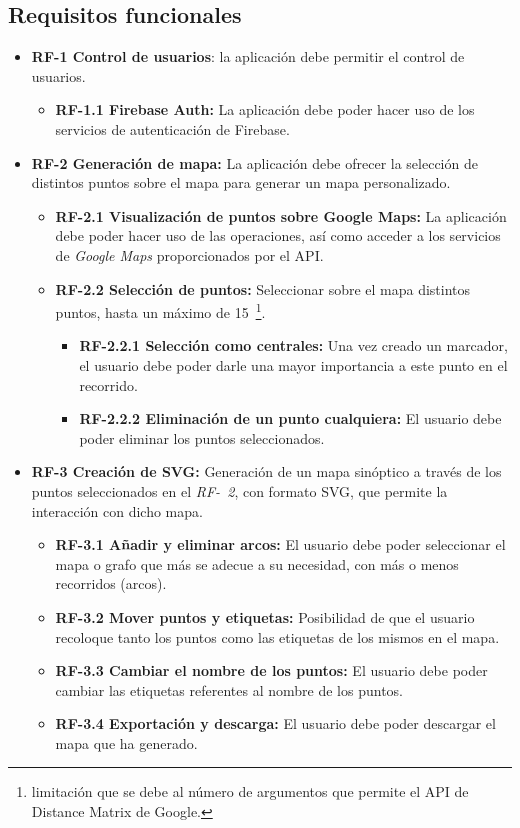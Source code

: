 \subsection{Requisitos funcionales}
\begin{itemize}
	\item \textbf{RF-1 Control de usuarios}: la aplicación debe permitir el control de usuarios.
	\begin{itemize}
		\item \textbf{RF-1.1 Firebase Auth:} La aplicación debe poder hacer uso de los servicios de autenticación de Firebase.
	\end{itemize}
	\item \textbf{RF-2 Generación de mapa:} La aplicación debe ofrecer la selección de distintos puntos sobre el mapa para generar un mapa personalizado.
	\begin{itemize}
		\item \textbf{RF-2.1 Visualización de puntos sobre Google Maps:} La aplicación debe poder hacer uso de las operaciones, así como acceder a los servicios de \textit{Google Maps} proporcionados por el API.
		\item \textbf{RF-2.2 Selección de puntos:} Seleccionar sobre el mapa distintos puntos, hasta un máximo de 15~\footnote{limitación que se debe al número de argumentos que permite el API de Distance Matrix de Google.}.
		\begin{itemize}
			\item \textbf{RF-2.2.1 Selección como centrales:} Una vez creado un marcador, el usuario debe poder darle una mayor importancia a este punto en el recorrido.
			\item \textbf{RF-2.2.2 Eliminación de un punto cualquiera:} El usuario debe poder eliminar los puntos seleccionados. 
		\end{itemize}
		
	\end{itemize}
	\item \textbf{RF-3 Creación de SVG:} Generación de un mapa sinóptico a través de los puntos seleccionados en el \textit{RF-~2}, con formato SVG, que permite la interacción con dicho mapa.
	\begin{itemize}
		\item \textbf{RF-3.1 Añadir y eliminar arcos:} El usuario debe poder seleccionar el mapa o grafo que más se adecue a su necesidad, con más o menos recorridos (arcos).
		\item \textbf{RF-3.2 Mover puntos y etiquetas:} Posibilidad de que el usuario recoloque tanto los puntos como las etiquetas de los mismos en el mapa.
		\item \textbf{RF-3.3 Cambiar el nombre de los puntos:} El usuario debe poder cambiar las etiquetas referentes al nombre de los puntos.
		\item \textbf{RF-3.4 Exportación y descarga:} El usuario debe poder descargar el mapa que ha generado.
	\end{itemize}
\end{itemize}


